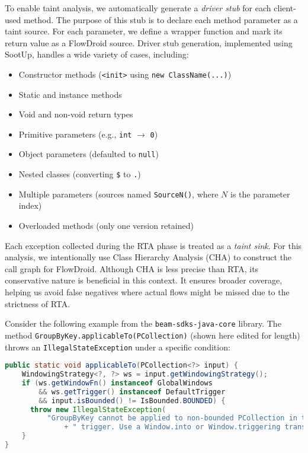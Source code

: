 To enable taint analysis, we automatically generate a \textit{driver stub} for each client-used method. The purpose of this stub is to declare each method parameter as a taint source. For each parameter, we define a wrapper function and mark its return value as a FlowDroid source. Driver stub generation, implemented using SootUp, handles a wide variety of cases, including:
\begin{itemize}
  \item Constructor methods (\texttt{<init>} using \texttt{new ClassName(...)})
  \item Static and instance methods
  \item Void and non-void return types
  \item Primitive parameters (e.g., \texttt{int} $\rightarrow$ \texttt{0})
  \item Object parameters (defaulted to \texttt{null})
  \item Nested classes (converting \texttt{\$} to \texttt{.})
  \item Multiple parameters (sources named \texttt{SourceN()}, where $N$ is the parameter index)
  \item Overloaded methods (only one version retained)
\end{itemize}

Each exception collected during the RTA phase is treated as a \textit{taint sink}. For this analysis, we intentionally use Class Hierarchy Analysis (CHA) to construct the call graph for FlowDroid. Although CHA is less precise than RTA, its conservative nature is beneficial in this context. It ensures broader coverage, helping us avoid false negatives where actual flows might be missed due to the strictness of RTA.

Consider the following example from the \texttt{beam-sdks-java-core} library. The method \texttt{GroupByKey.applicableTo(PCollection)} (shown here edited for length) throws an \texttt{IllegalStateException} under a specific condition:
\begin{lstlisting}[language=Java,breaklines=true,breakatwhitespace=false,basicstyle=\scriptsize\ttfamily]
public static void applicableTo(PCollection<?> input) {
    WindowingStrategy<?, ?> ws = input.getWindowingStrategy();
    if (ws.getWindowFn() instanceof GlobalWindows
        && ws.getTrigger() instanceof DefaultTrigger
        && input.isBounded() != IsBounded.BOUNDED) {
      throw new IllegalStateException(
          "GroupByKey cannot be applied to non-bounded PCollection in the GlobalWindow without a"
              + " trigger. Use a Window.into or Window.triggering transform prior to GroupByKey.");
    }
}
\end{lstlisting}

